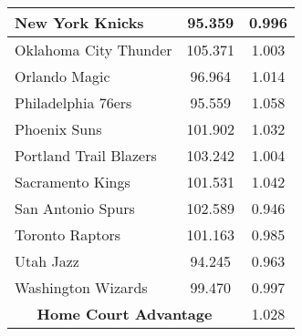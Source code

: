 \begin{table}[t]
\begin{tabular}{|l|c|c|}
New York Knicks & 95.359 & 0.996\\ \hline
Oklahoma City Thunder & 105.371 & 1.003\\ \hline
Orlando Magic & 96.964 & 1.014\\ \hline
Philadelphia 76ers & 95.559 & 1.058\\ \hline
Phoenix Suns & 101.902 & 1.032\\ \hline
Portland Trail Blazers & 103.242 & 1.004\\ \hline
Sacramento Kings & 101.531  & 1.042\\ \hline
San Antonio Spurs & 102.589 & 0.946\\ \hline
Toronto Raptors & 101.163 & 0.985 \\ \hline
Utah Jazz & 94.245 & 0.963 \\ \hline
Washington Wizards & 99.470  & 0.997\\ \hline
\multicolumn{2}{|c|}{\textbf{Home Court Advantage}} & 1.028\\ \hline
\end{tabular}
\label{table:dr_1_141516}
\end{table}